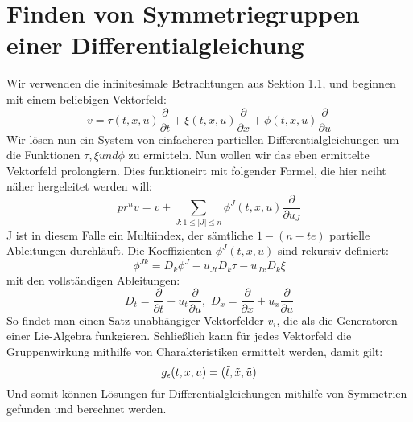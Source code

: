 \documentclass[a4paper]{article}
\begin{document}
\section{Finden von Symmetriegruppen einer Differentialgleichung}
Wir verwenden die infinitesimale Betrachtungen aus Sektion 1.1, und beginnen mit einem beliebigen Vektorfeld:
\begin{equation}
    v=\tau (t,x,u)\frac{\partial}{\partial t}+\xi (t,x,u)\frac{\partial}{\partial x}+\phi (t,x,u)\frac{\partial}{\partial u}
\end{equation}
Wir lösen nun ein System von einfacheren partiellen Differentialgleichungen um die Funktionen $\tau , \xi und \phi$ zu ermitteln. Nun wollen wir das eben ermittelte Vektorfeld prolongiern. Dies funktioneirt mit folgender Formel, die hier nciht näher hergeleitet werden will:
\begin{equation}
    pr^{n}v=v+\sum_{J:1\leq |J|\leq n}\phi^J(t,x,u)\frac{\partial}{\partial u_J}
\end{equation}
J ist in diesem Falle ein Multiindex, der sämtliche $1-(n-te)$ partielle Ableitungen durchläuft. Die Koeffizienten $\phi^J(t,x,u)$ sind rekursiv definiert:
\begin{equation}
    \phi^{Jk}=D_k\phi^J-u_{Jt}D_k\tau-u_{Jx}D_k\xi
\end{equation}
mit den vollständigen Ableitungen:
$$D_t=\frac{\partial}{\partial t}+u_t\frac{\partial}{\partial u},\,\, D_x=\frac{\partial}{\partial x}+u_x\frac{\partial}{\partial u}$$
\newline
So findet man einen Satz unabhängiger Vektorfelder $v_i$, die als die Generatoren einer Lie-Algebra funkgieren. Schließlich kann für jedes Vektorfeld die Gruppenwirkung mithilfe von Charakteristiken ermittelt werden, damit gilt:
\begin{equation}
    g_\epsilon(t,x,u)=(\Tilde{t},\Tilde{x},\Tilde{u})
\end{equation}
Und somit können Lösungen für Differentialgleichungen mithilfe von Symmetrien gefunden und berechnet werden.
\end{document}
